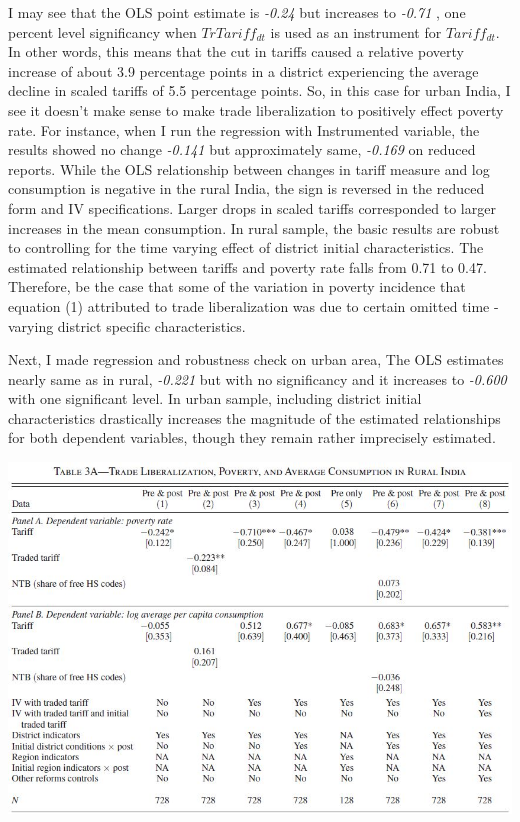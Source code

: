\documentclass[a4paper,12pt]{article}
\begin{document}
I may see that the OLS point estimate is \textit{-0.24} but increases to \textit{-0.71 }, one percent level significancy when $TrTariff_{dt}$ is used as an instrument for $Tariff_{dt}$. In other words, this means that the cut in tariffs caused a relative poverty increase of about 3.9 percentage points in a district experiencing the average decline in scaled tariffs of 5.5 percentage points.  So, in this case for urban India, I see it doesn't make sense to make trade liberalization to positively effect poverty rate. For instance,  when I run the regression with Instrumented variable, the results showed no change \textit{-0.141} but approximately same, \textit{-0.169} on reduced reports. While the OLS relationship between changes in tariff measure and log consumption is negative in the rural India, the sign is reversed in the reduced form and IV specifications.  Larger drops in scaled tariffs corresponded to larger increases in the mean consumption. In rural sample, the basic results are robust to controlling for the time varying effect of district initial characteristics. The estimated relationship between tariffs and poverty rate falls from 0.71 to 0.47. Therefore, be the case that some of the variation in poverty incidence that equation (1) attributed to trade liberalization was due to certain omitted time - varying district specific characteristics. 

Next, I made regression and robustness check on urban area, The OLS estimates nearly same as in rural, \textit{-0.221} but with no significancy and it increases to \textit{-0.600} with one significant level.  In urban sample, including district initial characteristics drastically increases the magnitude of the estimated relationships for both dependent variables, though they remain rather imprecisely estimated. 

\begin{table}[h]
\centering
\includegraphics[width=1\textwidth]{Table3a.JPG}
\caption{\label{fig:Figure1}}
\end{table}
\end{document}
